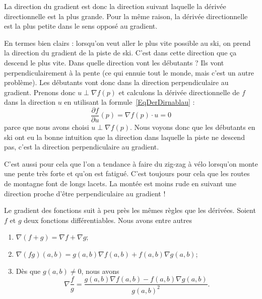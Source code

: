 La direction du gradient est donc la direction suivant laquelle la dérivée directionnelle est la plus grande. Pour la même raison, la dérivée directionnelle est la plus petite dans le sens opposé au gradient.

En termes bien clairs : lorsqu'on veut aller le plus vite possible au ski, on prend la direction du gradient de la piste de ski. C'est dans cette direction que ça descend le plus vite. Dans quelle direction vont les débutants ? Ils vont perpendiculairement à la pente (ce qui ennuie tout le monde, mais c'est un autre problème). Les débutants vont donc dans la direction perpendiculaire au gradient. Prenons donc $u\perp \nabla f(p)$ et calculons la dérivée directionnelle de $f$ dans la direction $u$ en utilisant la formule~\ref{EqDerDirnablau} :
\begin{equation}
    \frac{ \partial f }{ \partial u }(p)=\nabla f(p)\cdot u=0
\end{equation}
parce que nous avons choisi $u\perp \nabla f(p)$. Nous voyons donc que les débutants en ski ont eu la bonne intuition que la direction dans laquelle la piste ne descend pas, c'est la direction perpendiculaire au gradient.

C'est aussi pour cela que l'on a tendance à faire du zig-zag à vélo lorsqu'on monte une pente très forte et qu'on est fatigué. C'est toujours pour cela que les routes de montagne font de longs lacets. La montée est moins rude en suivant une direction proche d'être perpendiculaire au gradient !

\begin{theorem}
    Le gradient des fonctions suit à peu près les mêmes règles que les dérivées. Soient $f$ et $g$ deux fonctions différentiables. Nous avons entre autres
    \begin{enumerate}
        \item
            $\nabla(f+g)=\nabla f+\nabla g$;
        \item
            $\nabla(fg)(a,b)=g(a,b)\nabla f(a,b)+f(a,b)\nabla g(a,b)$;
        \item
            Dès que $g(a,b)\neq 0$, nous avons
            \begin{equation}
                \nabla\frac{ f }{ g }=\frac{ g(a,b)\nabla f(a,b)-f(a,b)\nabla g(a,b) }{ g(a,b)^2 }.
            \end{equation}
    \end{enumerate}
\end{theorem}


